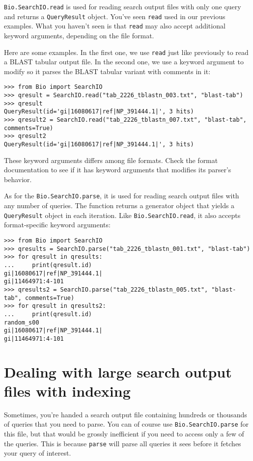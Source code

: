 \verb|Bio.SearchIO.read| is used for reading search output files with only one
query and returns a \verb|QueryResult| object. You've seen \verb|read| used in
our previous examples. What you haven't seen is that \verb|read| may also accept
additional keyword arguments, depending on the file format.

Here are some examples. In the first one, we use \verb|read| just like
previously to read a BLAST tabular output file. In the second one, we use a
keyword argument to modify so it parses the BLAST tabular variant with comments
in it:

\begin{verbatim}
>>> from Bio import SearchIO
>>> qresult = SearchIO.read("tab_2226_tblastn_003.txt", "blast-tab")
>>> qresult
QueryResult(id='gi|16080617|ref|NP_391444.1|', 3 hits)
>>> qresult2 = SearchIO.read("tab_2226_tblastn_007.txt", "blast-tab", comments=True)
>>> qresult2
QueryResult(id='gi|16080617|ref|NP_391444.1|', 3 hits)
\end{verbatim}

These keyword arguments differs among file formats. Check the format
documentation to see if it has keyword arguments that modifies its parser's
behavior.

As for the \verb|Bio.SearchIO.parse|, it is used for reading search output
files with any number of queries. The function returns a generator object that
yields a \verb|QueryResult| object in each iteration. Like
\verb|Bio.SearchIO.read|, it also accepts format-specific keyword arguments:

\begin{verbatim}
>>> from Bio import SearchIO
>>> qresults = SearchIO.parse("tab_2226_tblastn_001.txt", "blast-tab")
>>> for qresult in qresults:
...     print(qresult.id)
gi|16080617|ref|NP_391444.1|
gi|11464971:4-101
>>> qresults2 = SearchIO.parse("tab_2226_tblastn_005.txt", "blast-tab", comments=True)
>>> for qresult in qresults2:
...     print(qresult.id)
random_s00
gi|16080617|ref|NP_391444.1|
gi|11464971:4-101
\end{verbatim}

\section{Dealing with large search output files with indexing}
\label{sec:searchio-index}

Sometimes, you're handed a search output file containing hundreds or thousands
of queries that you need to parse. You can of course use
\verb|Bio.SearchIO.parse| for this file, but that would be grossly inefficient
if you need to access only a few of the queries. This is because \verb|parse|
will parse all queries it sees before it fetches your query of interest.

